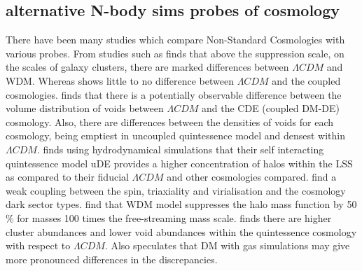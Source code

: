 \documentclass[a4paper,fleqn,usenatbib]{mnras}
\begin{document}
\subsection{alternative N-body sims probes of cosmology}
There have been many studies which compare Non-Standard Cosmologies with various probes. From studies such as \citet{Elahi_14} finds that above the suppression scale, on the scales of galaxy clusters, there are marked differences between $\Lambda CDM$ and WDM. Whereas \citet{Elahi_15} shows little to no difference between $\Lambda CDM$ and the coupled cosmologies. \citet{Adermann_17} finds that there is a potentially observable difference between the volume distribution of voids between $\Lambda CDM$ and the CDE (coupled DM-DE) cosmology. Also, there are differences between the densities of voids for each cosmology, being emptiest in uncoupled quintessence model and densest within $\Lambda CDM$. \citet{Carlesi_14a} finds using hydrodynamical simulations that their  self interacting quintessence model uDE provides a higher concentration of halos within the LSS as compared to their fiducial $\Lambda CDM$ and other cosmologies compared. \citet{Carlesi_14b} find a weak coupling between the spin, triaxiality and virialisation and the cosmology dark sector types. \citet{Smith_11} find that WDM model suppresses the halo mass function by 50$\%$ for masses 100 times the free-streaming mass scale. \citet{Watts_17} finds there are higher cluster abundances and lower void abundances within the quintessence cosmology with respect to $\Lambda CDM$. Also speculates that DM with gas simulations may give more pronounced differences in the discrepancies.
\end{document}
